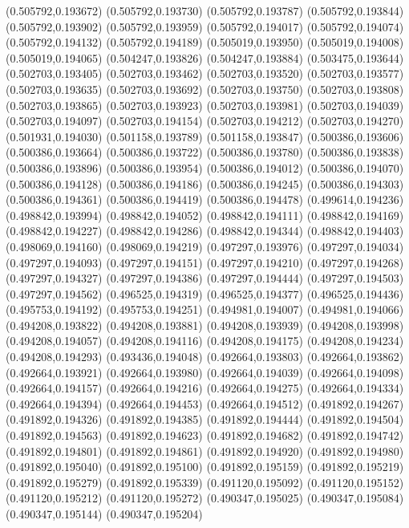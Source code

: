 (0.505792,0.193672)
(0.505792,0.193730)
(0.505792,0.193787)
(0.505792,0.193844)
(0.505792,0.193902)
(0.505792,0.193959)
(0.505792,0.194017)
(0.505792,0.194074)
(0.505792,0.194132)
(0.505792,0.194189)
(0.505019,0.193950)
(0.505019,0.194008)
(0.505019,0.194065)
(0.504247,0.193826)
(0.504247,0.193884)
(0.503475,0.193644)
(0.502703,0.193405)
(0.502703,0.193462)
(0.502703,0.193520)
(0.502703,0.193577)
(0.502703,0.193635)
(0.502703,0.193692)
(0.502703,0.193750)
(0.502703,0.193808)
(0.502703,0.193865)
(0.502703,0.193923)
(0.502703,0.193981)
(0.502703,0.194039)
(0.502703,0.194097)
(0.502703,0.194154)
(0.502703,0.194212)
(0.502703,0.194270)
(0.501931,0.194030)
(0.501158,0.193789)
(0.501158,0.193847)
(0.500386,0.193606)
(0.500386,0.193664)
(0.500386,0.193722)
(0.500386,0.193780)
(0.500386,0.193838)
(0.500386,0.193896)
(0.500386,0.193954)
(0.500386,0.194012)
(0.500386,0.194070)
(0.500386,0.194128)
(0.500386,0.194186)
(0.500386,0.194245)
(0.500386,0.194303)
(0.500386,0.194361)
(0.500386,0.194419)
(0.500386,0.194478)
(0.499614,0.194236)
(0.498842,0.193994)
(0.498842,0.194052)
(0.498842,0.194111)
(0.498842,0.194169)
(0.498842,0.194227)
(0.498842,0.194286)
(0.498842,0.194344)
(0.498842,0.194403)
(0.498069,0.194160)
(0.498069,0.194219)
(0.497297,0.193976)
(0.497297,0.194034)
(0.497297,0.194093)
(0.497297,0.194151)
(0.497297,0.194210)
(0.497297,0.194268)
(0.497297,0.194327)
(0.497297,0.194386)
(0.497297,0.194444)
(0.497297,0.194503)
(0.497297,0.194562)
(0.496525,0.194319)
(0.496525,0.194377)
(0.496525,0.194436)
(0.495753,0.194192)
(0.495753,0.194251)
(0.494981,0.194007)
(0.494981,0.194066)
(0.494208,0.193822)
(0.494208,0.193881)
(0.494208,0.193939)
(0.494208,0.193998)
(0.494208,0.194057)
(0.494208,0.194116)
(0.494208,0.194175)
(0.494208,0.194234)
(0.494208,0.194293)
(0.493436,0.194048)
(0.492664,0.193803)
(0.492664,0.193862)
(0.492664,0.193921)
(0.492664,0.193980)
(0.492664,0.194039)
(0.492664,0.194098)
(0.492664,0.194157)
(0.492664,0.194216)
(0.492664,0.194275)
(0.492664,0.194334)
(0.492664,0.194394)
(0.492664,0.194453)
(0.492664,0.194512)
(0.491892,0.194267)
(0.491892,0.194326)
(0.491892,0.194385)
(0.491892,0.194444)
(0.491892,0.194504)
(0.491892,0.194563)
(0.491892,0.194623)
(0.491892,0.194682)
(0.491892,0.194742)
(0.491892,0.194801)
(0.491892,0.194861)
(0.491892,0.194920)
(0.491892,0.194980)
(0.491892,0.195040)
(0.491892,0.195100)
(0.491892,0.195159)
(0.491892,0.195219)
(0.491892,0.195279)
(0.491892,0.195339)
(0.491120,0.195092)
(0.491120,0.195152)
(0.491120,0.195212)
(0.491120,0.195272)
(0.490347,0.195025)
(0.490347,0.195084)
(0.490347,0.195144)
(0.490347,0.195204)
